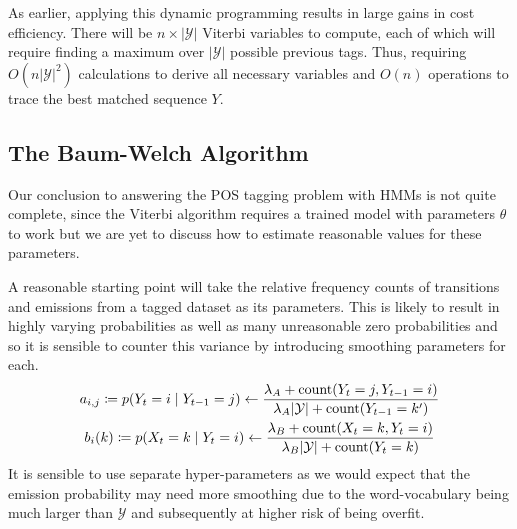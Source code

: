\documentclass[../main.tex]{subfiles}
\begin{document}
As earlier, applying this dynamic programming results in large gains in cost efficiency. There will be $n \times |\mathcal{Y}|$ Viterbi variables to compute, each of which will require finding a maximum over $|\mathcal{Y}|$ possible previous tags. Thus, requiring $O(n|\mathcal{Y}|^2)$ calculations to derive all necessary variables and $O(n)$ operations to trace the best matched sequence $Y$.

\subsection{The Baum-Welch Algorithm}

Our conclusion to answering the POS tagging problem with HMMs is not quite complete, since the Viterbi algorithm requires a trained model with parameters $\theta$ to work but we are yet to discuss how to estimate reasonable values for these parameters.

A reasonable starting point will take the relative frequency counts of transitions and emissions from a tagged dataset as its parameters.
This is likely to result in highly varying probabilities as well as many unreasonable zero probabilities and so it is sensible to counter this variance by introducing smoothing parameters for each.
\begin{gather*}
    a_{i,j} \coloneqq p(Y_t = i \mid Y_{t-1} = j) \gets \frac{\lambda_A + \operatorname{count} (Y_t = j,  Y_{t-1} = i)}{\lambda_A |\mathcal{Y}| + \operatorname{count} (Y_{t-1} = k')} \\
    b_i(k) \coloneqq p(X_t = k \mid Y_t = i) \gets \frac{\lambda_B + \operatorname{count} (X_t = k ,  Y_t = i)}{\lambda_B |\mathcal{Y}| + \operatorname{count} (Y_t = k)}
\end{gather*}
It is sensible to use separate hyper-parameters as we would expect that the emission probability may need more smoothing due to the word-vocabulary being much larger than $\mathcal{Y}$ and subsequently at higher risk of being overfit.
\end{document}
